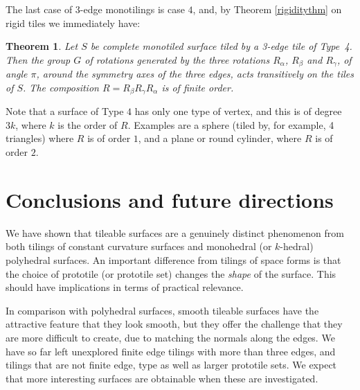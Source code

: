 \documentclass[11pt]{amsart}
\newtheorem{theorem}{Theorem}
\theoremstyle{remark}
\newcounter{case}
\begin{document}
The last case of $3$-edge monotilings is case $4$, and, by Theorem \ref{rigiditythm} on rigid tiles we 
immediately have:
\begin{theorem}  \label{thm:type4}
  Let $S$ be complete monotiled surface tiled by a 3-edge tile of
  Type~4.  Then  the group $G$ of rotations generated by the three
  rotations $R_\alpha$, 
  $R_\beta$ and $R_\gamma$, of angle $\pi$, around the symmetry axes of the three edges, acts transitively
  on the tiles of $S$. The composition $R=R_\beta R_\gamma R_\alpha$ is of finite order.
  \end{theorem}
Note  that a surface of Type $4$ has only one type of vertex, and this is of degree $3k$, where $k$ is the 
order of $R$.  Examples are a sphere (tiled by, for example, 4 triangles) where $R$ is of order $1$, and a plane or round cylinder, where $R$ is of order $2$.

\section{Conclusions and future directions}
We have shown that tileable surfaces are a genuinely distinct phenomenon from both tilings of constant curvature surfaces and monohedral (or $k$-hedral) polyhedral surfaces.   An important difference from tilings of space forms is that the choice of prototile (or prototile set) changes the \emph{shape} of the surface. This should have implications in terms of practical relevance.

In comparison with polyhedral surfaces, smooth tileable surfaces have the attractive feature that they look smooth, but they offer the challenge that they are more difficult to create, due to matching the normals along the edges.  We have so far left unexplored finite edge tilings with more than three edges, and tilings that are not finite edge, type as well as larger prototile sets. We expect that more interesting surfaces are obtainable when these are investigated.
\end{document}
